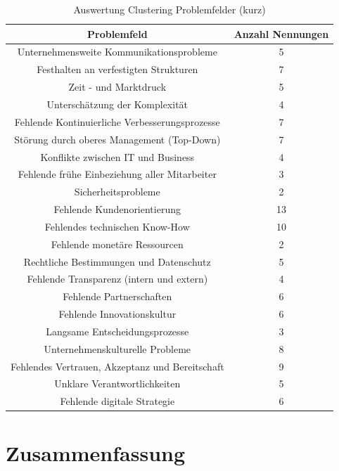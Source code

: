 \begin{table}[ht]
	\centering
	\caption{Auswertung Clustering Problemfelder (kurz)}
	\begin{tabular}{|c|c|}
		\hline
		\textbf{Problemfeld}& \textbf{Anzahl Nennungen} \\
		\hline
		Unternehmensweite Kommunikationsprobleme        & 5  \\
		Festhalten an verfestigten Strukturen           & 7  \\
		Zeit - und Marktdruck                           & 5  \\
		Unterschätzung der Komplexität                  & 4  \\
		Fehlende Kontinuierliche Verbesserungsprozesse  & 7  \\
		Störung durch oberes Management (Top-Down)      & 7  \\
		Konflikte zwischen IT und Business              & 4  \\
		Fehlende frühe Einbeziehung aller Mitarbeiter   & 3  \\
		Sicherheitsprobleme                             & 2  \\
		Fehlende Kundenorientierung                     & 13 \\
		Fehlendes technischen Know-How                  & 10 \\
		Fehlende monetäre Ressourcen                    & 2  \\
		Rechtliche Bestimmungen und Datenschutz         & 5  \\
		Fehlende Transparenz (intern und extern)        & 4  \\
		Fehlende Partnerschaften                        & 6  \\
		Fehlende Innovationskultur                      & 6  \\
		Langsame Entscheidungsprozesse                  & 3  \\
		Unternehmenskulturelle Probleme                 & 8  \\
		Fehlendes Vertrauen, Akzeptanz und Bereitschaft & 9  \\
		Unklare Verantwortlichkeiten                    & 5  \\
		Fehlende digitale Strategie                     & 6 \\
		\hline
	\end{tabular}
	\label{tab:clusteringpfshort}
\end{table}

\todots

\section{Zusammenfassung}


